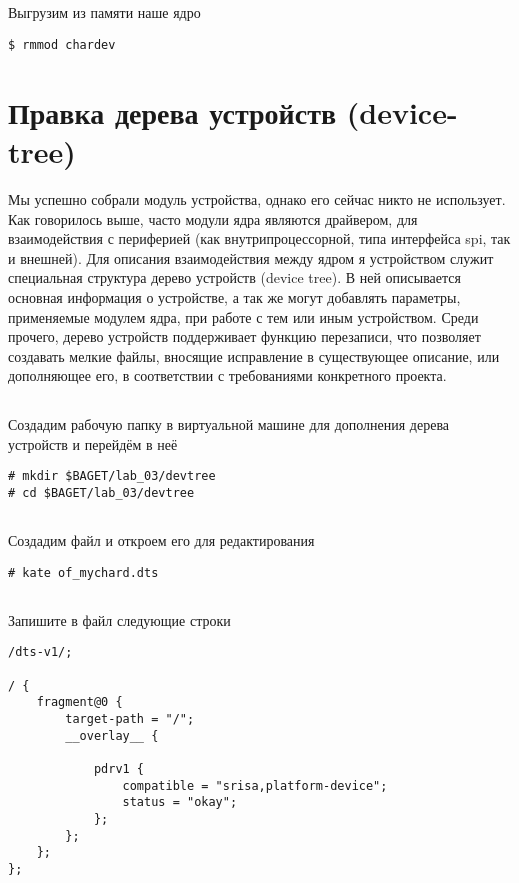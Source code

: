 \subsection{}Выгрузим из памяти наше ядро
\begin{lstlisting}[style=bash]
$ rmmod chardev
\end{lstlisting}

\section{Правка дерева устройств (device-tree)}
Мы успешно собрали модуль устройства, однако его сейчас никто не использует. Как говорилось выше, часто модули ядра являются драйвером, для взаимодействия с периферией (как внутрипроцессорной, типа интерфейса spi, так и внешней). Для описания взаимодействия между ядром я устройством служит специальная структура дерево устройств (device tree). В ней описывается основная информация о устройстве, а так же могут добавлять параметры, применяемые модулем ядра, при работе с тем или иным устройством. Среди прочего, дерево устройств поддерживает функцию перезаписи, что позволяет создавать мелкие файлы, вносящие исправление в существующее описание, или дополняющее его, в соответствии с требованиями конкретного проекта.

\subsection{}Создадим рабочую папку в виртуальной машине для дополнения дерева устройств и перейдём в неё
\begin{lstlisting}[style=bash]
# mkdir $BAGET/lab_03/devtree
# cd $BAGET/lab_03/devtree 
\end{lstlisting}

\subsection{}Создадим файл и откроем его для редактирования
\begin{lstlisting}[style=bash]
# kate of_mychard.dts
\end{lstlisting}

\subsection{}Запишите в файл следующие строки
\begin{lstlisting}[style=stdout]
/dts-v1/;

/ {
	fragment@0 {
		target-path = "/";
		__overlay__ {
			
			pdrv1 {
				compatible = "srisa,platform-device";
				status = "okay";
			};
		};
	};
};
\end{lstlisting}

